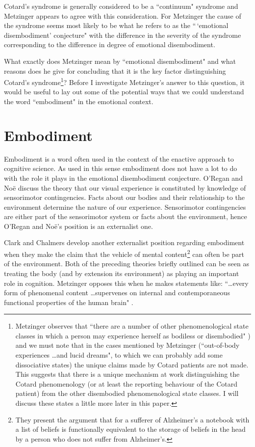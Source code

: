 Cotard's syndrome is generally considered to be a ``continuum" syndrome \citetext{\citealp[p. 173]{enoch1991}; \citealp[p. 148]{young1995}} and Metzinger appears to agree with this consideration. For Metzinger the cause of the syndrome seems most likely to be what he refers to as the ``\,`emotional disembodiment' conjecture" \cite[p. 458]{metzinger2003} with the difference in the severity of the syndrome corresponding to the difference in degree of emotional disembodiment.

What exactly does Metzinger mean by ``emotional disembodiment" and what reasons does he give for concluding that it is the key factor distinguishing Cotard's syndrome\footnote{Metzinger observes that ``there are a number of other phenomenological state classes in which a person may experience herself as bodiless or disembodied" \cite[p. 457]{metzinger2003}) and we must note that in the cases mentioned by Metzinger (``out-of-body experiences \ldots and lucid dreams", to which we can probably add some dissociative states) the unique claims made by Cotard patients are not made. This suggests that there is a unique mechanism at work distinguishing the Cotard phenomenology (or at least the reporting behaviour of the Cotard patient) from the other disembodied phenomenological state classes. I will discuss these states a little more later in this paper.}? Before I investigate Metzinger's answer to this question, it would be useful to lay out some of the potential ways that we could understand the word ``embodiment" in the emotional context.

\section{Embodiment}

Embodiment is a word often used in the context of the enactive approach to cognitive science. As used in this sense embodiment does not have a lot to do with the role it plays in the emotional disembodiment conjecture. O'Regan and No\"{e} \cite{oregan2001, noe2006} discuss the theory that our visual experience is constituted by knowledge of sensorimotor contingencies. Facts about our bodies and their relationship to the environment determine the nature of our experience. Sensorimotor contingencies are either part of the sensorimotor system or facts about the environment, hence O'Regan and No\"{e}'s position is an externalist one.

Clark and Chalmers \cite{clark2002} develop another externalist position regarding embodiment when they make the claim that the vehicle of mental content\footnote{They present the argument that for a sufferer of Alzheimer's a notebook with a list of beliefs is functionally equivalent to the storage of beliefs in the head by a person who does not suffer from Alzheimer's.} can often be part of the environment. Both of the preceding theories briefly outlined can be seen as treating the body (and by extension its environment) as playing an important role in cognition. Metzinger opposes this when he makes statements like: ``\ldots every form of phenomenal content \ldots supervenes on internal and contemporaneous functional properties of the human brain" \cite[p. 415]{metzinger2003}.

